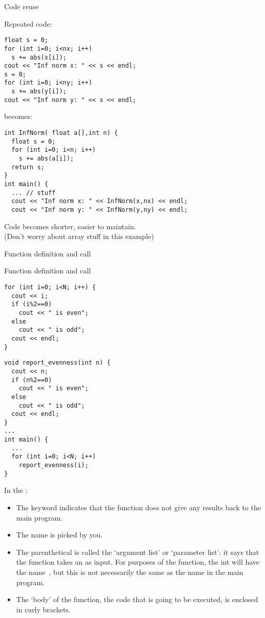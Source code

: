 \begin{block}{Code reuse}
  \label{sl:function-reuse}
  \begin{multicols}{2}
    \small
    Repeated code:
\begin{verbatim}
float s = 0;
for (int i=0; i<nx; i++)
  s += abs(x[i]);
cout << "Inf norm x: " << s << endl;
s = 0;
for (int i=0; i<ny; i++)
  s += abs(y[i]);
cout << "Inf norm y: " << s << endl;
\end{verbatim}
\vfill\columnbreak
becomes:
\begin{verbatim}
int InfNorm( float a[],int n) {
  float s = 0;
  for (int i=0; i<n; i++)
    s += abs(a[i]);
  return s;
}
int main() {
  ... // stuff
  cout << "Inf norm x: " << InfNorm(x,nx) << endl;
  cout << "Inf norm y: " << InfNorm(y,ny) << endl;
\end{verbatim}
  \end{multicols}
  Code becomes shorter, easier to maintain.\\
  (Don't worry about array stuff in this example)
\end{block}

 {Function definition and call}

\begin{slide}{Function definition and call}
  \label{sl:def-call}
  \begin{multicols}{2}
\begin{verbatim}
for (int i=0; i<N; i++) {
  cout << i;
  if (i%2==0)
    cout << " is even";
  else
    cout << " is odd";
  cout << endl;
}
\end{verbatim}
\columnbreak
\begin{verbatim}
void report_evenness(int n) {
  cout << n;
  if (n%2==0)
    cout << " is even";
  else
    cout << " is odd";
  cout << endl;
}
...
int main() {
  ...
  for (int i=0; i<N; i++)
    report_evenness(i);
}
\end{verbatim}
  \end{multicols}
\end{slide}

In the :
\begin{itemize}
\item The keyword  indicates that the function does
  not give any results back to the main program.
\item The name  is picked by you.
\item The parenthetical  is called the `argument list' or
  `parameter list': it
  says that the function takes an  as input. For purposes of
  the function, the int will have the name~, but this is not
  necessarily the same as the name in the main program.
\item The `body' of the function, the code that is going to be
  executed, is enclosed in curly brackets.
\end{itemize}

